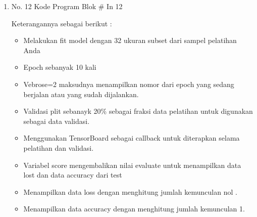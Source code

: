 \begin{enumerate}
\item No. 12 Kode Program Blok \# In 12
\par 
Keterangannya sebagai berikut :
\begin{itemize}
\item Melakukan fit model dengan 32 ukuran subset dari sampel pelatihan Anda
\item Epoch sebanyak 10 kali
\item Vebrose=2 maksudnya menampilkan nomor dari epoch yang sedang berjalan atau yang sudah dijalankan.
\item Validasi plit sebanayk 20\% sebagai fraksi data pelatihan untuk digunakan sebagai data validasi.
\item Menggunakan TensorBoard sebagai callback untuk diterapkan selama pelatihan dan validasi.
\item Variabel score mengembalikan nilai evaluate untuk menampilkan data lost dan data accuracy dari test
\item Menampilkan data loss dengan menghitung jumlah kemunculan nol .
\item Menampilkan data accuracy dengan menghitung jumlah kemunculan 1.
\end{itemize}


\end{enumerate}

